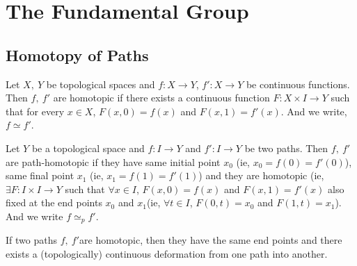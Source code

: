 
\chapter{The Fundamental Group}
\section{Homotopy of Paths}
\begin{definition}
	Let $X,\ Y$ be topological spaces and $f : X \to Y$, $f':X \to Y$ be continuous functions. Then $f,\ f'$ are homotopic if there exists a continuous function $F : X \times I \to Y$ such that for every $x \in X$, $F(x,0) = f(x)$ and $F(x,1) = f'(x)$. And we write, $f \simeq f'$.
\end{definition}

\begin{definition}
	Let $Y$ be a topological space and $f : I \to Y$ and $f' : I \to Y$ be two paths. Then $f,\ f'$ are path-homotopic if they have same initial point $x_0$ (ie, $x_0=f(0)=f'(0)$), same final point $x_1$ (ie, $x_1=f(1)=f'(1)$) and they are homotopic (ie, $\exists F: I \times I \to Y$ such that $\forall x \in I$, $F(x,0)=f(x)$ and $F(x,1)=f'(x)$ also fixed at the end points $x_0$ and $x_1$(ie, $\forall t \in I$, $F(0,t) = x_0$ and $F(1,t) = x_1$). And we write $f \simeq_p f'$.
\end{definition}

\begin{remark}
	If two paths $f,\ f'$are homotopic, then they have the same end points and there exists a (topologically) continuous deformation from one path into another.
\end{remark}


